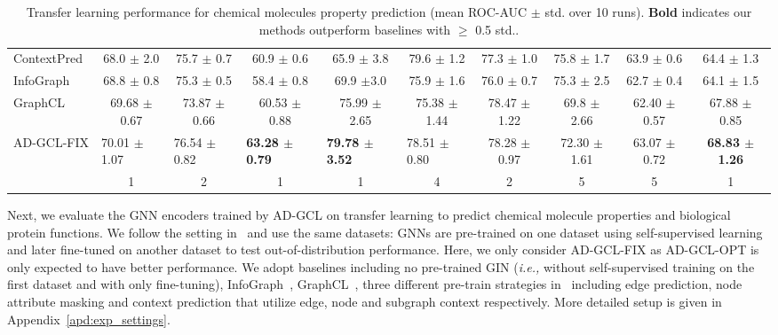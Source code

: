 \begin{table}[t]
{\begin{tabular}{lcccccccc|c}
ContextPred~\cite{hu2019strategies}  & 68.0 $\pm$ 2.0                      & 75.7 $\pm$ 0.7                       & 60.9 $\pm$ 0.6                       & 65.9 $\pm$ 3.8                       & 79.6 $\pm$ 1.2                       & 77.3 $\pm$ 1.0          & 75.8 $\pm$ 1.7   & 63.9 $\pm$ 0.6& 64.4 $\pm$ 1.3                                                                            \\
InfoGraph~\cite{sun2019infograph}    & 68.8 $\pm$ 0.8                      & 75.3 $\pm$ 0.5                       & 58.4 $\pm$ 0.8                       & 69.9 $\pm$3.0                        & 75.9 $\pm$ 1.6                       & 76.0 $\pm$ 0.7          & 75.3 $\pm$ 2.5   & 62.7 $\pm$ 0.4 & 64.1 $\pm$ 1.5                                                                            \\
GraphCL~\cite{you2020graph}      & 69.68 $\pm$ 0.67                    & 73.87 $\pm$ 0.66                     & 60.53 $\pm$ 0.88                     & 75.99 $\pm$ 2.65                     & 75.38 $\pm$ 1.44                     & 78.47 $\pm$ 1.22        & 69.8 $\pm$ 2.66  &  62.40 $\pm$ 0.57 & 67.88 $\pm$ 0.85                                                                          \\ \hline\hline
AD-GCL-FIX         & \multicolumn{1}{l}{70.01 $\pm$1.07} & \multicolumn{1}{l}{76.54 $\pm$ 0.82} & \multicolumn{1}{l}{\textbf{63.28 $\pm$ 0.79}} & \multicolumn{1}{l}{\textbf{79.78 $\pm$ 3.52}} & \multicolumn{1}{l}{78.51 $\pm$ 0.80} & 78.28 $\pm$ 0.97        & 72.30 $\pm$ 1.61 & 63.07 $\pm$ 0.72 & \textbf{68.83 $\pm$ 1.26} \\
\centering{Our Ranks} & 1 & 2 & 1 & 1 & 4 & 2 & 5 & 5 &  1 \\
\hline\hline
\end{tabular}%
}
\caption{\small{Transfer learning performance for chemical molecules property prediction (mean ROC-AUC $\pm$ std. over  10 runs). \textbf{Bold} indicates our methods outperform baselines with $\geq$ 0.5 std..} }%
\vspace{-5mm}
\label{tab:transfer_learning}
\end{table}Next, we evaluate the GNN encoders trained by AD-GCL on transfer learning to predict chemical molecule properties and biological protein functions. We follow the setting in~\cite{hu2019strategies} and use the same datasets: GNNs are pre-trained on one dataset using self-supervised learning and later fine-tuned on another dataset to test out-of-distribution performance. Here, we only consider AD-GCL-FIX as AD-GCL-OPT is only expected to have better performance. We adopt baselines including no pre-trained GIN (\textit{i.e.,} without self-supervised training on the first dataset and with only fine-tuning), InfoGraph~\cite{sun2019infograph}, GraphCL~\cite{you2020graph}, three different pre-train strategies in~\cite{hu2019strategies} including edge prediction, node attribute masking and context prediction that utilize edge, node and subgraph context respectively. More detailed setup is given in Appendix~\ref{apd:exp_settings}. 

